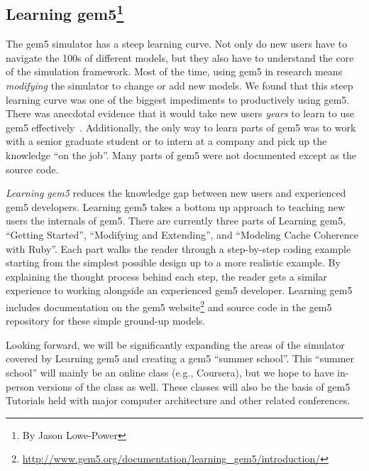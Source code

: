 \subsection[Learning gem5]{Learning gem5\footnote{By Jason Lowe-Power}}
\label{sec:learning}

The gem5 simulator has a steep learning curve.
Not only do new users have to navigate the 100s of different models, but they also have to understand the core of the simulation framework.
Most of the time, using gem5 in research means \emph{modifying} the simulator to change or add new models.
We found that this steep learning curve was one of the biggest impediments to productively using gem5.
There was anecdotal evidence that it would take new users \emph{years} to learn to use gem5 effectively~\cite{Power-gem5horrors-2015}.
Additionally, the only way to learn parts of gem5 was to work with a senior graduate student or to intern at a company and pick up the knowledge ``on the job''.
Many parts of gem5 were not documented except as the source code.

\emph{Learning gem5} reduces the knowledge gap between new users and experienced gem5 developers.
Learning gem5 takes a bottom up approach to teaching new users the internals of gem5.
There are currently three parts of Learning gem5, ``Getting Started'', ``Modifying and Extending'', and ``Modeling Cache Coherence with Ruby''.
Each part walks the reader through a step-by-step coding example starting from the simplest possible design up to a more realistic example.
By explaining the thought process behind each step, the reader gets a similar experience to working alongside an experienced gem5 developer.
Learning gem5 includes documentation on the gem5 website\footnote{\url{http://www.gem5.org/documentation/learning_gem5/introduction/}} and source code in the gem5 repository for these simple ground-up models.

Looking forward, we will be significantly expanding the areas of the simulator covered by Learning gem5 and creating a gem5 ``summer school''.
This ``summer school'' will mainly be an online class (e.g., Coursera), but we hope to have in-person versions of the class as well.
These classes will also be the basis of gem5 Tutorials held with major computer architecture and other related conferences.
